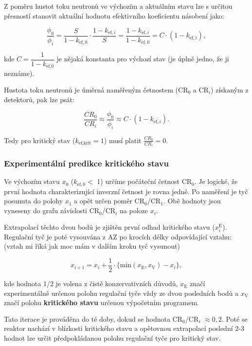 Z poměru hustot toku neutronů ve výchozím a aktuálním stavu lze s určitou přesností stanovit aktuální hodnotu efektivního koeficientu násobení jako:

\begin{equation*}
    \frac{\phi_0}{\phi_i} = \frac{S}{1 - k_{\text{ef},0}} \cdot \frac{1 - k_{\text{ef},i}}{S} = \frac{1 - k_{\text{ef},i}}{1 - k_{\text{ef},0}}= C \cdot (1-k_{\text{ef},i}),
\end{equation*}

kde $C=\dfrac{1}{1-k_\text{ef,0}}$ je nějaká konstanta pro výchozí stav (je úplně jedno, že ji neznáme).

Hustota toku neutronů je úměrná naměřeným četnostem (CR$_0$ a CR$_i$) získaným z detektorů, pak lze psát:

\begin{equation*}
    \frac{CR_0}{CR_i} \approx \frac{\phi_0}{\phi_i} \approx C \cdot (1-k_{\text{ef},i}).
\end{equation*}

Tedy pro kritický stav ($k_{\text{ef},\text{krit}} = 1$) musí platit $\frac{CR_0}{CR_i} = 0$.

\subsubsection{Experimentální predikce kritického stavu}

Ve výchozím stavu $x_0$ ($k_{\text{ef},0} <$  1) určíme počáteční četnost CR$_0$. Je logické, že první hodnota charakterizující inverzní četnost je rovna jedné. Po naměření je tyč posunuta do polohy $x_1$ a opět určen poměr CR$_0$/CR$_1$. Obě hodnoty jsou vyneseny do grafu závislosti CR$_0$/CR$_i$ na poloze $x_i$.

Extrapolací těchto dvou bodů je zjištěn první odhad kritického stavu ($x_i^\text{E}$). Regulační tyč je poté vysouvána z AZ po krocích délky odpovídající vztahu: (vztah mi říká jak moc mám v dalším kroku tyč vysunout)

\begin{equation} \label{eq:KS}
    x_{i+1} =x_i+\frac{1}{2} \cdot \{\text{min}(x_\text{E},x_\text{V}) - x_i\},
\end{equation}

kde hodnota 1/2 je volena z čistě konzervativních důvodů, $x_\text{E}$ značí experimentálně určenou polohu regulační tyče vždy ze dvou posledních bodů a $x_\text{V}$ značí polohu \textbf{kritického stavu} určenou výpočetním programem.

Tato iterace je prováděna do té doby, dokud se hodnota CR$_0$/CR$_i$ $\approx 0,2$. Poté se reaktor nachází v blízkosti kritického stavu a opětovnou extrapolací poslední 2-3 hodnot lze určit předpokládanou polohu regulační tyče pro kritický stav.

